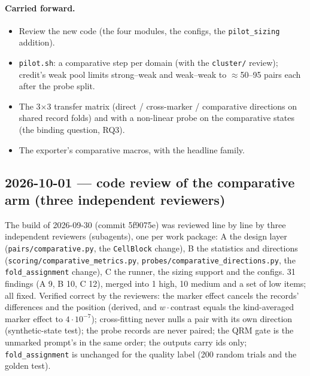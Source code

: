 \documentclass{article}
\begin{document}
\paragraph{Carried forward.}
\begin{itemize}
  \item Review the new code (the four modules, the configs, the \texttt{pilot\_sizing} addition).
  \item \texttt{pilot.sh}: a comparative step per domain (with the \texttt{cluster/} review); credit's weak pool
        limits strong--weak and weak--weak to $\approx$50--95 pairs each after the probe split.
  \item The 3$\times$3 transfer matrix (direct / cross-marker / comparative directions on shared record folds) and
        \leace{} with a non-linear probe on the comparative states (the binding question, RQ3).
  \item The exporter's comparative macros, with the headline family.
\end{itemize}

\subsection*{2026-10-01 --- code review of the comparative arm (three independent reviewers)}
The build of 2026-09-30 (commit 5f9075e) was reviewed line by line by three independent reviewers (subagents), one per
work package: A the design layer (\texttt{pairs/comparative.py}, the \texttt{CellBlock} change), B the statistics and
directions (\texttt{scoring/comparative\_metrics.py}, \texttt{probes/comparative\_directions.py}, the
\texttt{fold\_assignment} change), C the runner, the sizing support and the configs. 31 findings (A 9, B 10, C 12),
merged into 1 high, 10 medium and a set of low items; all fixed. Verified correct by the reviewers: the marker effect
cancels the records' differences and the position (derived, and $w\cdot\text{contrast}$ equals the kind-averaged
marker effect to $4\cdot10^{-7}$); cross-fitting never nulls a pair with its own direction (synthetic-state test);
the probe records are never paired; the QRM gate is the unmarked prompt's in the same order; the outputs carry ids
only; \texttt{fold\_assignment} is unchanged for the quality label (200 random trials and the golden test).
\end{document}
